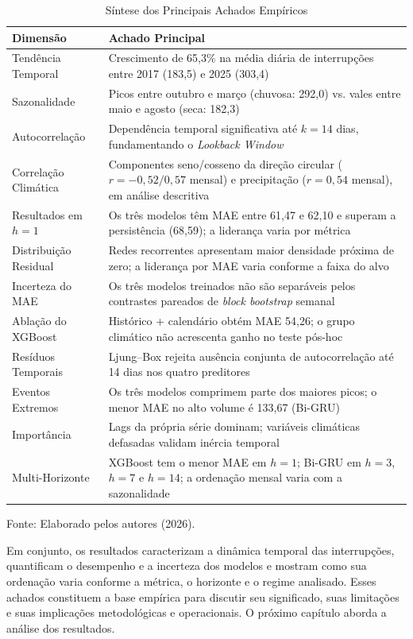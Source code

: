 \begin{table}[H]
\caption{Síntese dos Principais Achados Empíricos}
\label{tab:sintese}
\begin{center}
\small
\begin{tabular}{p{3.8cm} p{9cm}}
\toprule
\textbf{Dimensão} & \textbf{Achado Principal} \\
\midrule
Tendência Temporal & Crescimento de 65,3\% na média diária de interrupções entre 2017 (183,5) e 2025 (303,4) \\
Sazonalidade & Picos entre outubro e março (chuvosa: 292,0) vs. vales entre maio e agosto (seca: 182,3) \\
Autocorrelação & Dependência temporal significativa até $k=14$ dias, fundamentando o \textit{Lookback Window} \\
Correlação Climática & Componentes seno/cosseno da direção circular ($r=-0{,}52/0{,}57$ mensal) e precipitação ($r=0{,}54$ mensal), em análise descritiva \\
Resultados em $h=1$ & Os três modelos têm MAE entre 61,47 e 62,10 e superam a persistência (68,59); a liderança varia por métrica \\
Distribuição Residual & Redes recorrentes apresentam maior densidade próxima de zero; a liderança por MAE varia conforme a faixa do alvo \\
Incerteza do MAE & Os três modelos treinados não são separáveis pelos contrastes pareados de \textit{block bootstrap} semanal \\
Ablação do XGBoost & Histórico + calendário obtém MAE 54,26; o grupo climático não acrescenta ganho no teste pós-hoc \\
Resíduos Temporais & Ljung--Box rejeita ausência conjunta de autocorrelação até 14 dias nos quatro preditores \\
Eventos Extremos & Os três modelos comprimem parte dos maiores picos; o menor MAE no alto volume é 133,67 (Bi-GRU) \\
Importância & Lags da própria série dominam; variáveis climáticas defasadas validam inércia temporal \\
Multi-Horizonte & XGBoost tem o menor MAE em $h=1$; Bi-GRU em $h=3$, $h=7$ e $h=14$; a ordenação mensal varia com a sazonalidade \\
\bottomrule
\end{tabular}
\normalsize
\end{center}
\small{Fonte: Elaborado pelos autores (2026).}
\end{table}

Em conjunto, os resultados caracterizam a dinâmica temporal das interrupções, quantificam o desempenho e a incerteza dos modelos e mostram como sua ordenação varia conforme a métrica, o horizonte e o regime analisado. Esses achados constituem a base empírica para discutir seu significado, suas limitações e suas implicações metodológicas e operacionais. O próximo capítulo aborda a análise dos resultados.
